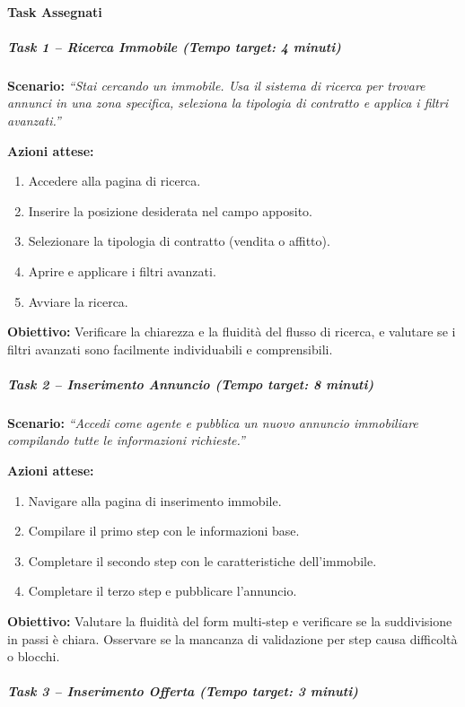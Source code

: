 \documentclass{article}
\begin{document}
\paragraph{Task Assegnati}

\subparagraph{Task 1 -- Ricerca Immobile (Tempo target: 4 minuti)}

\textbf{Scenario:} \textit{``Stai cercando un immobile. Usa il sistema di 
ricerca per trovare annunci in una zona specifica, seleziona la tipologia 
di contratto e applica i filtri avanzati.''}

\textbf{Azioni attese:}
\begin{enumerate}
    \item Accedere alla pagina di ricerca.
    \item Inserire la posizione desiderata nel campo apposito.
    \item Selezionare la tipologia di contratto (vendita o affitto).
    \item Aprire e applicare i filtri avanzati.
    \item Avviare la ricerca.
\end{enumerate}

\textbf{Obiettivo:} Verificare la chiarezza e la fluidità del flusso di 
ricerca, e valutare se i filtri avanzati sono facilmente individuabili 
e comprensibili.

\subparagraph{Task 2 -- Inserimento Annuncio (Tempo target: 8 minuti)}

\textbf{Scenario:} \textit{``Accedi come agente e pubblica un nuovo annuncio 
immobiliare compilando tutte le informazioni richieste.''}

\textbf{Azioni attese:}
\begin{enumerate}
    \item Navigare alla pagina di inserimento immobile.
    \item Compilare il primo step con le informazioni base.
    \item Completare il secondo step con le caratteristiche dell'immobile.
    \item Completare il terzo step e pubblicare l'annuncio.
\end{enumerate}

\textbf{Obiettivo:} Valutare la fluidità del form multi-step e verificare 
se la suddivisione in passi è chiara. Osservare se la mancanza di 
validazione per step causa difficoltà o blocchi.

\subparagraph{Task 3 -- Inserimento Offerta (Tempo target: 3 minuti)}
\end{document}
